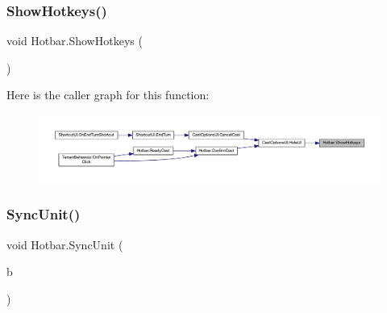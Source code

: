 \subsubsection{\texorpdfstring{ShowHotkeys()}{ShowHotkeys()}}
{\footnotesize\ttfamily void Hotbar.\+Show\+Hotkeys (\begin{DoxyParamCaption}{ }\end{DoxyParamCaption})}

Here is the caller graph for this function\+:
\nopagebreak
\begin{figure}[H]
\begin{center}
\leavevmode
\includegraphics[width=350pt]{class_hotbar_a989b6728a8d86d60a851f68954edab90_icgraph}
\end{center}
\end{figure}
\mbox{\label{class_hotbar_a1e796a0a133ee0743aa8585c05980f9b}} 
\subsubsection{\texorpdfstring{SyncUnit()}{SyncUnit()}}
{\footnotesize\ttfamily void Hotbar.\+Sync\+Unit (\begin{DoxyParamCaption}\item[{\mbox{\hyperlink{class_base_unit}{Base\+Unit}}}]{b }\end{DoxyParamCaption})}

